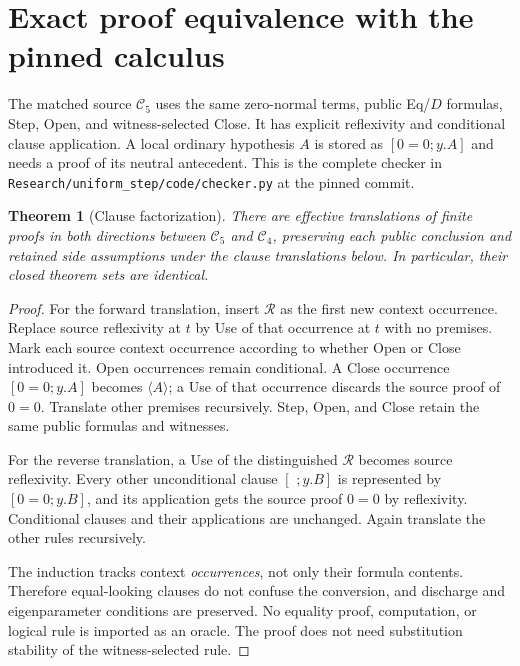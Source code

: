 \documentclass[11pt]{article}
\newtheorem{theorem}{Theorem}[section]
\theoremstyle{definition}
\newcommand{\RC}{\mathcal C_4}
\newcommand{\Old}{\mathcal C_5}
\newcommand{\RR}{\mathcal R}
\newcommand{\cl}[1]{\langle #1\rangle}
\begin{document}
\section{Exact proof equivalence with the pinned calculus}
\label{sec:equivalence}

The matched source $\Old$ uses the same zero-normal terms, public Eq/$D$
formulas, Step, Open, and witness-selected Close. It has explicit reflexivity
and conditional clause application. A local ordinary hypothesis $A$ is
stored as $[0=0;y.A]$ and needs a proof of its neutral antecedent.
This is the complete checker in
\nolinkurl{Research/uniform_step/code/checker.py} at the pinned commit.

\begin{theorem}[Clause factorization]
\label{thm:factorization}
There are effective translations of finite proofs in both directions
between $\Old$ and $\RC$, preserving each public conclusion and retained
side assumptions under the clause translations below. In particular,
their closed theorem sets are identical.
\end{theorem}
\begin{proof}
For the forward translation, insert $\RR$ as the first new context
occurrence. Replace source reflexivity at $t$ by Use of that occurrence
at $t$ with no premises. Mark each source context occurrence according to
whether Open or Close introduced it. Open occurrences remain conditional.
A Close occurrence $[0=0;y.A]$ becomes $\cl{A}$; a Use of that occurrence
discards the source proof of $0=0$. Translate other premises recursively.
Step, Open, and Close retain the same public formulas and witnesses.

For the reverse translation, a Use of the distinguished $\RR$ becomes
source reflexivity. Every other unconditional clause $[\,\,;y.B]$ is
represented by $[0=0;y.B]$, and its application gets the source proof
$0=0$ by reflexivity. Conditional clauses and their applications are
unchanged. Again translate the other rules recursively.

The induction tracks context \emph{occurrences}, not only their formula
contents. Therefore equal-looking clauses do not confuse the conversion,
and discharge and eigenparameter conditions are preserved. No equality
proof, computation, or logical rule is imported as an oracle. The proof
does not need substitution stability of the witness-selected rule.
\end{proof}
\end{document}
